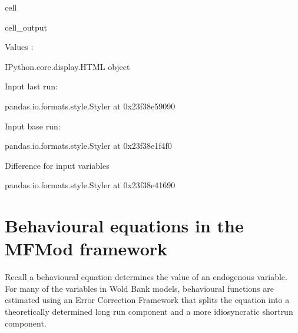 \documentclass[letterpaper,10pt,english]{jupyterBook}
\begin{document}
\begin{sphinxuseclass}{cell}
\begin{sphinxVerbatimOutput}
\begin{sphinxuseclass}{cell_output}
\begin{sphinxVerbatim}[commandchars=\\\{\}]
Values :
\end{sphinxVerbatim}

\begin{sphinxVerbatim}[commandchars=\\\{\}]
\PYGZlt{}IPython.core.display.HTML object\PYGZgt{}
\end{sphinxVerbatim}

\begin{sphinxVerbatim}[commandchars=\\\{\}]
Input last run:
\end{sphinxVerbatim}

\begin{sphinxVerbatim}[commandchars=\\\{\}]
\PYGZlt{}pandas.io.formats.style.Styler at 0x23f38e59090\PYGZgt{}
\end{sphinxVerbatim}

\begin{sphinxVerbatim}[commandchars=\\\{\}]
Input base run:
\end{sphinxVerbatim}

\begin{sphinxVerbatim}[commandchars=\\\{\}]
\PYGZlt{}pandas.io.formats.style.Styler at 0x23f38e1f4f0\PYGZgt{}
\end{sphinxVerbatim}

\begin{sphinxVerbatim}[commandchars=\\\{\}]
Difference for input variables
\end{sphinxVerbatim}

\begin{sphinxVerbatim}[commandchars=\\\{\}]
\PYGZlt{}pandas.io.formats.style.Styler at 0x23f38e41690\PYGZgt{}
\end{sphinxVerbatim}

\begin{sphinxVerbatim}[commandchars=\\\{\}]

\end{sphinxVerbatim}

\end{sphinxuseclass}\end{sphinxVerbatimOutput}

\end{sphinxuseclass}

\section{Behavioural equations in the MFMod framework}
\label{\detokenize{content/05_WBModels/LoadingWBModel:behavioural-equations-in-the-mfmod-framework}}
\sphinxAtStartPar
Recall a behavioural equation determines the value of an endogenous variable. For many of the variables in Wold Bank models, behavioural functions are estimated using an Error Correction Framework that splits the equation into a theoretically determined long run component and a more idiosyncratic short\sphinxhyphen{}run component.
\end{document}

